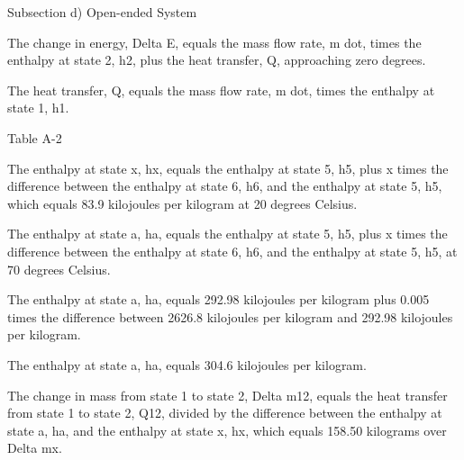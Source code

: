 Subsection d) Open-ended System

The change in energy, Delta E, equals the mass flow rate, m dot, times the enthalpy at state 2, h2, plus the heat transfer, Q, approaching zero degrees.

The heat transfer, Q, equals the mass flow rate, m dot, times the enthalpy at state 1, h1.

Table A-2

The enthalpy at state x, hx, equals the enthalpy at state 5, h5, plus x times the difference between the enthalpy at state 6, h6, and the enthalpy at state 5, h5, which equals 83.9 kilojoules per kilogram at 20 degrees Celsius.

The enthalpy at state a, ha, equals the enthalpy at state 5, h5, plus x times the difference between the enthalpy at state 6, h6, and the enthalpy at state 5, h5, at 70 degrees Celsius.

The enthalpy at state a, ha, equals 292.98 kilojoules per kilogram plus 0.005 times the difference between 2626.8 kilojoules per kilogram and 292.98 kilojoules per kilogram.

The enthalpy at state a, ha, equals 304.6 kilojoules per kilogram.

The change in mass from state 1 to state 2, Delta m12, equals the heat transfer from state 1 to state 2, Q12, divided by the difference between the enthalpy at state a, ha, and the enthalpy at state x, hx, which equals 158.50 kilograms over Delta mx.